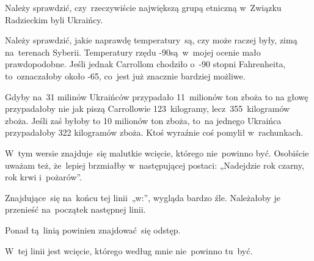 \documentclass[a4paper,11pt]{article}
\begin{document}
\vspace{\spaceFour}



\start {} Należy sprawdzić, czy~rzeczywiście największą grupą
etniczną w~Związku Radzieckim byli Ukraińcy.

\vspace{\spaceFour}



\start {} Należy sprawdzić, jakie naprawdę temperatury~są, czy
może raczej były, zimą na~terenach Syberii. Temperatury rzędu
-90\textcelsius są~w~mojej ocenie mało prawdopodobne. Jeśli jednak
Carrollom chodziło o~-90 stopni Fahrenheita, to~oznaczałoby około
-65\textcelsius, co~jest już znacznie bardziej możliwe.

\vspace{\spaceFour}



 Gdyby na~31 milinów Ukraińców przypadało 11~milionów ton
zboża to na głowę przypadałoby nie jak piszą Carrollowie
123~kilogramy, lecz~355~kilogramów zboża. Jeśli zaś byłoby to 10
milionów ton zboża, to~na jednego Ukraińca przypadałoby 322 kilogramów
zboża. Ktoś wyraźnie coś pomylił w~rachunkach.

\vspace{\spaceFour}



\start {} W~tym wersie znajduje~się malutkie wcięcie,
którego nie~powinno być. Osobiście uważam też, że~lepiej brzmiałby
w~następującej postaci: „Nadejdzie rok czarny, rok krwi i~pożarów”.

\vspace{\spaceFour}



\start {} Znajdujące~się na~końcu tej linii~„w:”, wygląda
bardzo źle. Należałoby je przenieść na~początek następnej linii.

\vspace{\spaceFour}



\start {} Ponad tą~linią powinien znajdować~się odstęp.

\vspace{\spaceFour}



\start {} W~tej linii jest wcięcie, którego według mnie
nie~powinno tu~być.

\vspace{\spaceFour}
\end{document}
